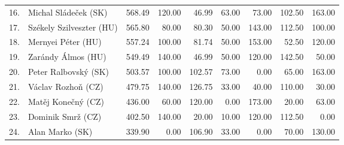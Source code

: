 \begin{tabular}{rl|r|rrrrrr}
16. & Michal Sládeček (SK) & 568.49 & 120.00 & 46.99 & 63.00 & 73.00 & 102.50 & 163.00 \\
17. & Székely Szilveszter (HU) & 565.80 & 80.00 & 80.30 & 50.00 & 143.00 & 112.50 & 100.00 \\
18. & Mernyei Péter (HU) & 557.24 & 100.00 & 81.74 & 50.00 & 153.00 & 52.50 & 120.00 \\
19. & Zarándy Álmos (HU) & 549.49 & 140.00 & 46.99 & 50.00 & 120.00 & 142.50 & 50.00 \\
20. & Peter Ralbovský (SK) & 503.57 & 100.00 & 102.57 & 73.00 & 0.00 & 65.00 & 163.00 \\
21. & Václav Rozhoň (CZ) & 479.75 & 140.00 & 126.75 & 33.00 & 40.00 & 110.00 & 30.00 \\
22. & Matěj Konečný (CZ) & 436.00 & 60.00 & 120.00 & 0.00 & 173.00 & 20.00 & 63.00 \\
23. & Dominik Smrž (CZ) & 402.50 & 140.00 & 20.00 & 10.00 & 120.00 & 112.50 & 0.00 \\
24. & Alan Marko (SK) & 339.90 & 0.00 & 106.90 & 33.00 & 0.00 & 70.00 & 130.00 \\
\end{tabular}

